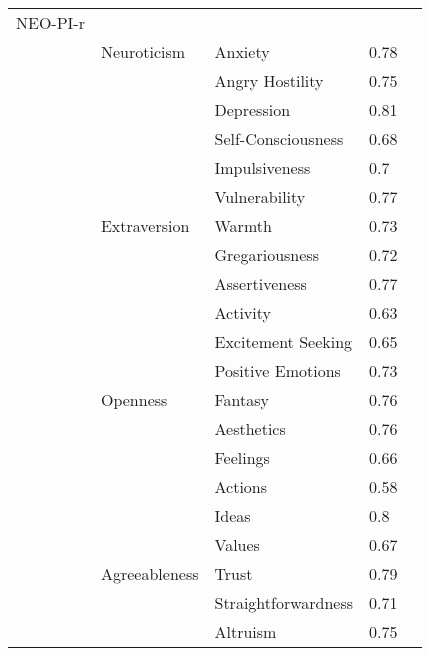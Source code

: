\documentclass[]{article}
\begin{document}
\begin{longtable}{@{\extracolsep{\fill}}*5{l}}
         NEO-PI-r     &      &                      &             &         \\
         & Neuroticism       & Anxiety              & 0.78        &         \\
         &                   & Angry Hostility      & 0.75        &         \\
         &                   & Depression           & 0.81        &         \\
         &                   & Self-Consciousness   & 0.68        &         \\
         &                   & Impulsiveness        & 0.7         &         \\
         &                   & Vulnerability        & 0.77        &         \\
         & Extraversion      & Warmth               & 0.73        &         \\
         &                   & Gregariousness       & 0.72        &         \\
         &                   & Assertiveness        & 0.77        &         \\
         &                   & Activity             & 0.63        &         \\
         &                   & Excitement Seeking   & 0.65        &         \\
         &                   & Positive Emotions    & 0.73        &         \\
         & Openness          & Fantasy              & 0.76        &         \\
         &                   & Aesthetics           & 0.76        &         \\
         &                   & Feelings             & 0.66        &         \\
         &                   & Actions              & 0.58        &         \\
         &                   & Ideas                & 0.8         &         \\
         &                   & Values               & 0.67        &         \\
         & Agreeableness     & Trust                & 0.79        &         \\
         &                   & Straightforwardness  & 0.71        &         \\
         &                   & Altruism             & 0.75        &         \\

\end{longtable}
\end{document}
